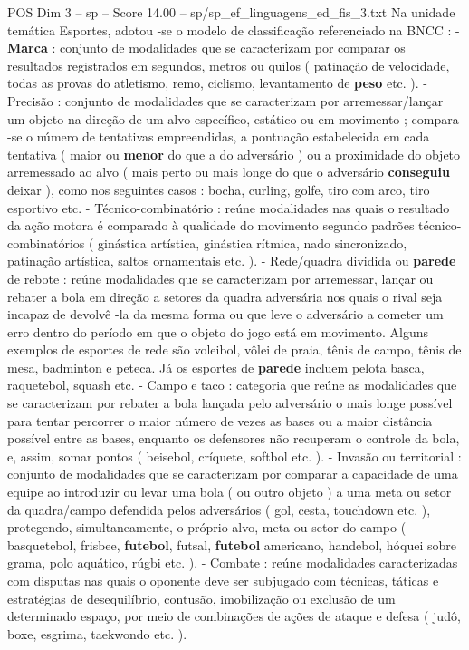 \begin{textsample}{POS Dim 3 – sp – Score 14.00 – sp/sp\_ef\_linguagens\_ed\_fis\_3.txt}  \label{ex:f3_pos_207}
Na unidade temática Esportes, adotou -se o modelo de classificação referenciado na BNCC : - \textbf{Marca} : conjunto de modalidades que se caracterizam por comparar os resultados registrados em segundos, metros ou quilos ( patinação de velocidade, todas as provas do atletismo, remo, ciclismo, levantamento de \textbf{peso} etc. ). - Precisão : conjunto de modalidades que se caracterizam por arremessar/lançar um objeto na direção de um alvo específico, estático ou em movimento ; compara -se o número de tentativas empreendidas, a pontuação estabelecida em cada tentativa ( maior ou \textbf{menor} do que a do adversário ) ou a proximidade do objeto arremessado ao alvo ( mais perto ou mais longe do que o adversário \textbf{conseguiu} deixar ), como nos seguintes casos : bocha, curling, golfe, tiro com arco, tiro esportivo etc. - Técnico-combinatório : reúne modalidades nas quais o resultado da ação motora é comparado à qualidade do movimento segundo padrões técnico-combinatórios ( ginástica artística, ginástica rítmica, nado sincronizado, patinação artística, saltos ornamentais etc. ). - Rede/quadra dividida ou \textbf{parede} de rebote : reúne modalidades que se caracterizam por arremessar, lançar ou rebater a bola em direção a setores da quadra adversária nos quais o rival seja incapaz de devolvê -la da mesma forma ou que leve o adversário a cometer um erro dentro do período em que o objeto do jogo está em movimento.
Alguns exemplos de esportes de rede são voleibol, vôlei de praia, tênis de campo, tênis de mesa, badminton e peteca.
Já os esportes de \textbf{parede} incluem pelota basca, raquetebol, squash etc. - Campo e taco : categoria que reúne as modalidades que se caracterizam por rebater a bola lançada pelo adversário o mais longe possível para tentar percorrer o maior número de vezes as bases ou a maior distância possível entre as bases, enquanto os defensores não recuperam o controle da bola, e, assim, somar pontos ( beisebol, críquete, softbol etc. ). - Invasão ou territorial : conjunto de modalidades que se caracterizam por comparar a capacidade de uma equipe ao introduzir ou levar uma bola ( ou outro objeto ) a uma meta ou setor da quadra/campo defendida pelos adversários ( gol, cesta, touchdown etc. ), protegendo, simultaneamente, o próprio alvo, meta ou setor do campo ( basquetebol, frisbee, \textbf{futebol}, futsal, \textbf{futebol} americano, handebol, hóquei sobre grama, polo aquático, rúgbi etc. ). - Combate : reúne modalidades caracterizadas com disputas nas quais o oponente deve ser subjugado com técnicas, táticas e estratégias de desequilíbrio, contusão, imobilização ou exclusão de um determinado espaço, por meio de combinações de ações de ataque e defesa ( judô, boxe, esgrima, taekwondo etc. ).

\end{textsample}
